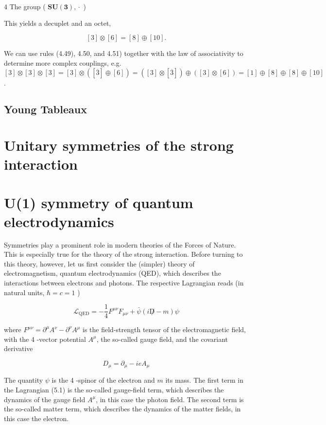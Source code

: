 \documentclass[10pt, letterpaper]{article}
\begin{document}
4 The group ( $\boldsymbol{S U} \mathbf{( 3 ) ,} \cdot$ )

This yields a decuplet and an octet,

$$
[3] \otimes[6]=[8] \oplus[10] .
$$

We can use rules (4.49), 4.50, and 4.51) together with the law of associativity to determine more complex couplings, e.g.\\
$[3] \otimes[3] \otimes[3]=[3] \otimes([\overline{3}] \oplus[6])=([3] \otimes[\overline{3}]) \oplus([3] \otimes[6])=[1] \oplus[8] \oplus[8] \oplus[10]$.

\subsection{Young Tableaux}

\section{Unitary symmetries of the strong interaction}

\section{U(1) symmetry of quantum electrodynamics}
Symmetries play a prominent role in modern theories of the Forces of Nature. This is especially true for the theory of the strong interaction. Before turning to this theory, however, let us first consider the (simpler) theory of electromagnetism, quantum electrodynamics (QED), which describes the interactions between electrons and photons. The respective Lagrangian reads (in natural units, $\hbar=c=1$ )

$$
\mathcal{L}_{\mathrm{QED}}=-\frac{1}{4} F^{\mu \nu} F_{\mu \nu}+\bar{\psi}(i \not D-m) \psi
$$

where $F^{\mu \nu}=\partial^{\mu} A^{\nu}-\partial^{\nu} A^{\mu}$ is the field-strength tensor of the electromagnetic field, with the 4 -vector potential $A^{\mu}$, the so-called gauge field, and the covariant derivative

$$
D_{\mu}=\partial_{\mu}-i e A_{\mu}
$$

The quantity $\psi$ is the 4 -spinor of the electron and $m$ its mass. The first term in the Lagrangian (5.1) is the so-called gauge-field term, which describes the dynamics of the gauge field $A^{\mu}$, in this case the photon field. The second term is the so-called matter term, which describes the dynamics of the matter fields, in this case the electron.
\end{document}

